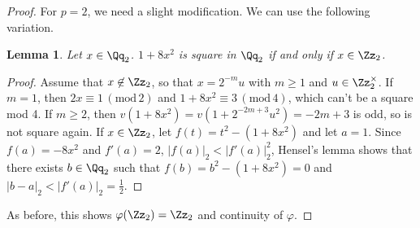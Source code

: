 \documentclass{article}
\newtheorem{lemma}{Lemma}
\newcommand{\Mod}[1]{\,(\mathrm{mod}\,#1)}
\begin{document}
\begin{proof}
For $p = 2$, we need a slight modification. We can use the following variation. 
\begin{lemma}
Let $x\in \Qq_{2}$. $1+8x^{2}$ is square in $\Qq_{2}$ if and only if $x\in \Zz_{2}$. 
\end{lemma}
\begin{proof}
Assume that $x\not\in \Zz_{2}$, so that $x = 2^{-m}u$ with $m\geq 1$ and $u\in \Zz_{2}^{\times}$. 
If $m = 1$, then $2x \equiv 1\Mod{2}$ and $1 + 8x^{2} \equiv 3 \Mod{4}$, which can't be a square mod 4. 
If $m \geq 2$, then $v(1+8x^{2}) = v(1 + 2^{-2m+3}u^{2}) = -2m+3$ is odd, so is not square again. 
If $x\in \Zz_{2}$, let $f(t) = t^{2}  - (1+8x^{2})$ and let $a = 1$. Since $f(a) = -8x^{2}$ and $f'(a) = 2$, $|f(a)|_{2}  < |f'(a)|_{2}^{2}$, Hensel's lemma shows that there exists $b\in\Qq_{2}$ such that $f(b) =b^{2} - (1+8x^{2}) = 0$ and $|b-a|_{2} < |f'(a)|_{2} = \frac{1}{2}$. 
\end{proof}
As before, this shows $\varphi(\Zz_{2}) =\Zz_{2}$ and continuity of $\varphi$. 
\end{proof}
\end{document}
